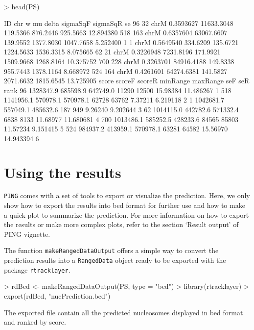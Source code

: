 \documentclass[11pt]{article}
\begin{document}
\begin{Schunk}
\begin{Sinput}
> head(PS)
\end{Sinput}
\begin{Soutput}
     ID  chr         w         mu    delta  sigmaSqF  sigmaSqR        se
96   32 chrM 0.3593627 11633.3048 119.5366  876.2446  925.5663 12.894380
518 163 chrM 0.6357604 63067.6607 139.9552 1377.8030 1047.7658  5.252400
1     1 chrM 0.5649540   334.6209 135.6721 1224.5633 1536.3315  8.075665
62   21 chrM 0.3226948  7231.8196 171.9921 1509.9668 1268.8164 10.375752
700 228 chrM 0.3263701 84916.4188 149.8338  955.7443 1378.1164  8.668972
524 164 chrM 0.4261601 64274.6381 141.5827 2071.6632 1815.6545 13.725905
        score   scoreF   scoreR minRange maxRange      seF       seR rank
96  1328347.9 685598.9 642749.0    11290    12500 15.98384 11.486267    1
518 1141956.1 570978.1 570978.1    62728    63762  7.37211  6.219118    2
1   1042681.7 557049.1 485632.6      187      949  9.26240  9.202644    3
62  1014115.0 442782.6 571332.4     6838     8133 11.68977 11.680681    4
700 1013486.1 585252.5 428233.6    84565    85803 11.57234  9.151415    5
524  984937.2 413959.1 570978.1    63281    64582 15.56970 14.943394    6
\end{Soutput}
\end{Schunk}

\section{Using the results}
\texttt{PING} comes with a set of tools to export or visualize the prediction.
Here, we only show how to export the results into bed format for further use
and how to make a quick plot to summarize the prediction. For more information
on how to export the results or make more complex plots, refer to the section
`Result output' of PING vignette.

The function \texttt{makeRangedDataOutput} offers a simple way to convert the
prediction results into a \texttt{RangedData} object ready to be exported with
the package \texttt{rtracklayer}.

\begin{Schunk}
\begin{Sinput}
> rdBed <- makeRangedDataOutput(PS, type = "bed")
> library(rtracklayer)
> export(rdBed, "nucPrediction.bed")
\end{Sinput}
\end{Schunk}

The exported file contain all the predicted nucleosomes displayed in bed format
and ranked by score.
\end{document}

